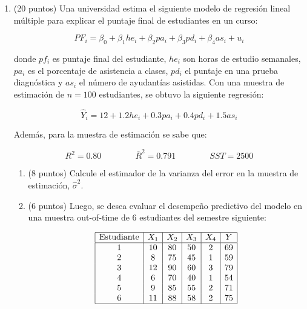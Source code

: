 \documentclass[10pt,a4paper]{article}
\begin{document}
\begin{enumerate}
\begin{enumerate}
    Al omitir \(Z\) del modelo simple, parte de su efecto queda recogido por el coeficiente de \(X\), inflando su estimación.

    El valor del sesgo por variable omitida se puede calcular como:
    \[
    \text{Sesgo}=\hat\beta_1^{RLS}-\hat\beta_1^{RLM}
    \]
    entonces:
    \[
    \text{Sesgo}=1.88-1.033=0.847
    \]

    Por lo tanto:
    \[
    \boxed{\text{Sesgo}=0.847}
    \]

    Como el sesgo es positivo, el modelo simple sobreestima levemente el efecto de las llamadas sobre las ventas.

\end{enumerate}

\item (20 puntos)  Una universidad estima el siguiente modelo de regresión lineal múltiple para explicar el puntaje final de estudiantes en un curso:

    \[
    PF_i=\beta_0+\beta_1he_{i}+\beta_2pa_{i}+\beta_3pd_{i}+\beta_4as_{i}+u_i
    \]

    donde \(pf_i\) es puntaje final del estudiante, \(he_{i}\) son horas de estudio semanales, \(pa_{i}\) es el porcentaje de asistencia a clases, \(pd_{i}\) el puntaje en una prueba diagnóstica y \(as_{i}\) el número de ayudantías asistidas. Con una muestra de estimación de \(n=100\) estudiantes, se obtuvo la siguiente regresión:

    \[
    \hat Y_i = 12 + 1.2he_{i} + 0.3pa_{i} + 0.4pd_{i} + 1.5as_{i}
    \]

    Además, para la muestra de estimación se sabe que:

    \[
    R^2 = 0.80
    \qquad\qquad
    \bar R^2 = 0.791
    \qquad\qquad
    SST = 2500
    \]

    \begin{enumerate}
\item (8 puntos) Calcule el estimador de la varianza del error en la muestra de estimación, \(\hat\sigma^2\).
        \item  (6 puntos)   Luego, se desea evaluar el desempeño predictivo del modelo en una muestra out-of-time de 6 estudiantes del semestre siguiente:

    \[
    \begin{array}{|c|c|c|c|c|c|}
    \hline
    \text{Estudiante} & X_1 & X_2 & X_3 & X_4 & Y \\
    \hline
    1 & 10 & 80 & 50 & 2 & 69 \\
    2 & 8 & 75 & 45 & 1 & 59 \\
    3 & 12 & 90 & 60 & 3 & 79 \\
    4 & 6 & 70 & 40 & 1 & 54 \\
    5 & 9 & 85 & 55 & 2 & 71 \\
    6 & 11 & 88 & 58 & 2 & 75 \\
    \hline
    \end{array}
    \]
        

\end{enumerate}
\end{enumerate}
\end{document}

